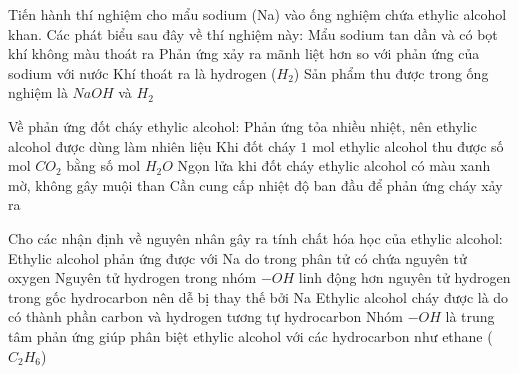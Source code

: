 \begin{ex}%
	Tiến hành thí nghiệm cho mẩu sodium (Na) vào ống nghiệm chứa ethylic alcohol khan. Các phát biểu sau đây về thí nghiệm này:
	\choiceTF
	{\True Mẩu sodium tan dần và có bọt khí không màu thoát ra}
	{Phản ứng xảy ra mãnh liệt hơn so với phản ứng của sodium với nước}
	{\True Khí thoát ra là hydrogen ($H_2$)}
	{Sản phẩm thu được trong ống nghiệm là $NaOH$ và $H_2$}
\end{ex}

\begin{ex}%
	Về phản ứng đốt cháy ethylic alcohol:
	\choiceTF
	{\True Phản ứng tỏa nhiều nhiệt, nên ethylic alcohol được dùng làm nhiên liệu}
	{Khi đốt cháy $1$ mol ethylic alcohol thu được số mol $CO_2$ bằng số mol $H_2O$}
	{\True Ngọn lửa khi đốt cháy ethylic alcohol có màu xanh mờ, không gây muội than}
	{Cần cung cấp nhiệt độ ban đầu để phản ứng cháy xảy ra}
\end{ex}

\begin{ex}%
	Cho các nhận định về nguyên nhân gây ra tính chất hóa học của ethylic alcohol:
	\choiceTF
	{Ethylic alcohol phản ứng được với Na do trong phân tử có chứa nguyên tử oxygen}
	{\True Nguyên tử hydrogen trong nhóm $-OH$ linh động hơn nguyên tử hydrogen trong gốc hydrocarbon nên dễ bị thay thế bởi Na}
	{Ethylic alcohol cháy được là do có thành phần carbon và hydrogen tương tự hydrocarbon}
	{\True Nhóm $-OH$ là trung tâm phản ứng giúp phân biệt ethylic alcohol với các hydrocarbon như ethane ($C_2H_6$)}
\end{ex}

